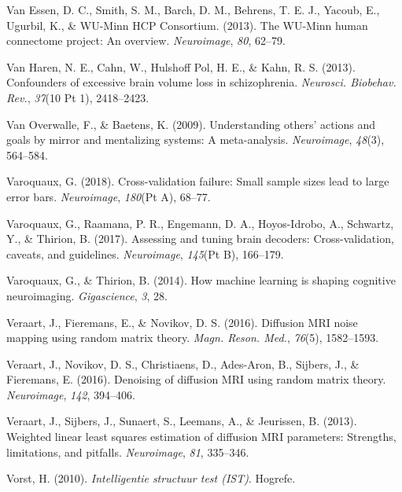 \documentclass[11pt,american,a4paper,oneside,]{memoir} %
\begin{document}
\leavevmode\hypertarget{ref-Van_Essen2013-df}{}%
Van Essen, D. C., Smith, S. M., Barch, D. M., Behrens, T. E. J., Yacoub, E., Ugurbil, K., \& WU-Minn HCP Consortium. (2013). The WU-Minn human connectome project: An overview. \emph{Neuroimage}, \emph{80}, 62--79.

\leavevmode\hypertarget{ref-Van_Haren2013-iv}{}%
Van Haren, N. E., Cahn, W., Hulshoff Pol, H. E., \& Kahn, R. S. (2013). Confounders of excessive brain volume loss in schizophrenia. \emph{Neurosci. Biobehav. Rev.}, \emph{37}(10 Pt 1), 2418--2423.

\leavevmode\hypertarget{ref-van2009understanding}{}%
Van Overwalle, F., \& Baetens, K. (2009). Understanding others' actions and goals by mirror and mentalizing systems: A meta-analysis. \emph{Neuroimage}, \emph{48}(3), 564--584.

\leavevmode\hypertarget{ref-Varoquaux2018-uo}{}%
Varoquaux, G. (2018). Cross-validation failure: Small sample sizes lead to large error bars. \emph{Neuroimage}, \emph{180}(Pt A), 68--77.

\leavevmode\hypertarget{ref-Varoquaux2017-fj}{}%
Varoquaux, G., Raamana, P. R., Engemann, D. A., Hoyos-Idrobo, A., Schwartz, Y., \& Thirion, B. (2017). Assessing and tuning brain decoders: Cross-validation, caveats, and guidelines. \emph{Neuroimage}, \emph{145}(Pt B), 166--179.

\leavevmode\hypertarget{ref-Varoquaux2014-su}{}%
Varoquaux, G., \& Thirion, B. (2014). How machine learning is shaping cognitive neuroimaging. \emph{Gigascience}, \emph{3}, 28.

\leavevmode\hypertarget{ref-Veraart2016-zi}{}%
Veraart, J., Fieremans, E., \& Novikov, D. S. (2016). Diffusion MRI noise mapping using random matrix theory. \emph{Magn. Reson. Med.}, \emph{76}(5), 1582--1593.

\leavevmode\hypertarget{ref-Veraart2016-rv}{}%
Veraart, J., Novikov, D. S., Christiaens, D., Ades-Aron, B., Sijbers, J., \& Fieremans, E. (2016). Denoising of diffusion MRI using random matrix theory. \emph{Neuroimage}, \emph{142}, 394--406.

\leavevmode\hypertarget{ref-Veraart2013-ya}{}%
Veraart, J., Sijbers, J., Sunaert, S., Leemans, A., \& Jeurissen, B. (2013). Weighted linear least squares estimation of diffusion MRI parameters: Strengths, limitations, and pitfalls. \emph{Neuroimage}, \emph{81}, 335--346.

\leavevmode\hypertarget{ref-Vorst2010-ex}{}%
Vorst, H. (2010). \emph{Intelligentie structuur test (IST)}. Hogrefe.
\end{document}
